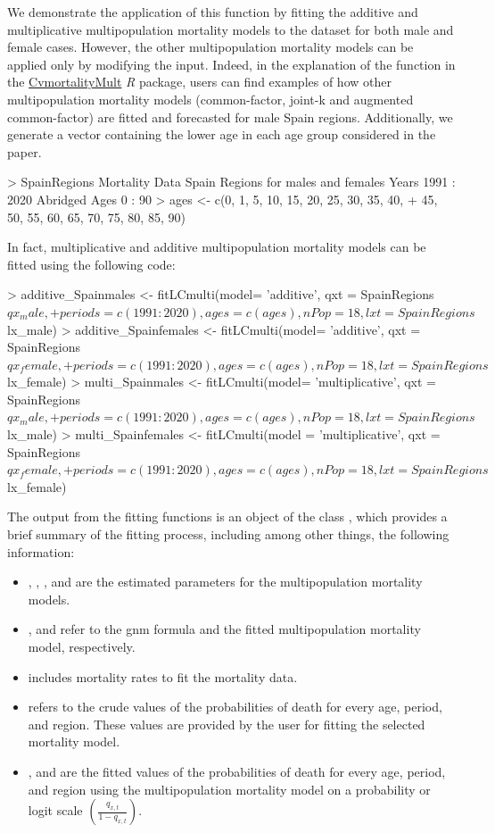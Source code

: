 We demonstrate the application of this function by fitting the additive and multiplicative multipopulation mortality models to the  dataset for both male and female cases. However, the other multipopulation mortality models can be applied only by modifying the  input. Indeed, in the explanation of the function  in the \href{https://cran.r-project.org/web/packages/CvmortalityMult/index.html}{CvmortalityMult} \emph{R} package, users can find examples of how other multipopulation mortality models (common-factor, joint-k and augmented common-factor) are fitted and forecasted for male Spain regions. Additionally, we generate a vector containing the lower age in each age group considered in the paper.
%
\begin{example}
> SpainRegions
Mortality Data
Spain Regions for males and females
Years 1991 : 2020
Abridged Ages 0 : 90
> ages <- c(0, 1, 5, 10, 15, 20, 25, 30, 35, 40,
+          45, 50, 55, 60, 65, 70, 75, 80, 85, 90)
\end{example}
%
In fact, multiplicative and additive multipopulation mortality models can be fitted using the following code:
%
\begin{example}
> additive_Spainmales <- fitLCmulti(model= 'additive', qxt = SpainRegions$qx_male,
+	periods = c(1991:2020), ages = c(ages), nPop = 18, lxt = SpainRegions$lx_male)
> additive_Spainfemales <- fitLCmulti(model= 'additive', qxt = SpainRegions$qx_female,
+	periods = c(1991:2020), ages = c(ages), nPop = 18, lxt = SpainRegions$lx_female)
> multi_Spainmales <- fitLCmulti(model= 'multiplicative', qxt = SpainRegions$qx_male,
+	periods = c(1991:2020), ages = c(ages), nPop = 18, lxt = SpainRegions$lx_male)
> multi_Spainfemales <- fitLCmulti(model = 'multiplicative', qxt = SpainRegions$qx_female,
+	periods = c(1991:2020), ages = c(ages), nPop = 18, lxt = SpainRegions$lx_female)
\end{example}
%
The output from the fitting functions is an object of the class , which provides a brief summary of the fitting process, including among other things, the following information:
\begin{itemize}
\item {}, , , and  are the estimated parameters for the multipopulation mortality models.
\item {}, and  refer to the gnm formula and the fitted multipopulation mortality model, respectively.
\item {} includes mortality rates to fit the mortality data.
\item {} refers to the crude values of the probabilities of death for every age, period, and region. These values are provided by the user for fitting the selected mortality model.
\item {}, and  are the fitted values of the probabilities of death for every age, period, and region using the multipopulation mortality model on a probability or logit scale $\left(\frac{q_{x,t}}{1-q_{x,t}} \right)$.
\end{itemize}

